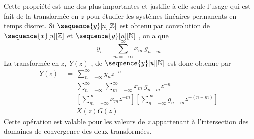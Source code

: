 Cette propri\'{e}t\'{e} est une des plus importantes et justffie \`{a} elle seule l'usage qui est fait de la transform\'{e}e en $z$ pour \'{e}tudier les syst\`{e}mes lin\'{e}aires permanents en temps discret. Si $\sequence{y}[n][\zset]$ est obtenu par convolution de $\sequence{x}[n][\zset]$ et $\sequence{g}[n][\nset]$ , on a que
$$
y_n=\sum_{m=-\infty}^{\infty}x_m\ g_{n-m}
$$
La transform\'{e}e en $z,\ Y(z)$ , de $\sequence{y}[n][\nset]$ est donc obtenue par
\begin{align*}
Y(z)\ &=\ \sum_{n=-\infty}^{\infty} y_n z^{-n} \\
&=\ \sum_{n=-\infty}^{\infty}\sum_{m=-\infty}^{\infty} x_m\ g_{n-m}z^{-n} \\
&=\ [\sum_{m=-\infty}^{\infty} x_m z^{-m}][\sum_{n=-\infty}^{\infty}g_{n-m}z^{-(n-m)}] \\
&=\ X(z)G(z)
\end{align*}
Cette op\'{e}ration est valable pour les valeurs de $z$ appartenant \`{a} l'intersection des domaines de convergence des deux transform\'{e}es.

